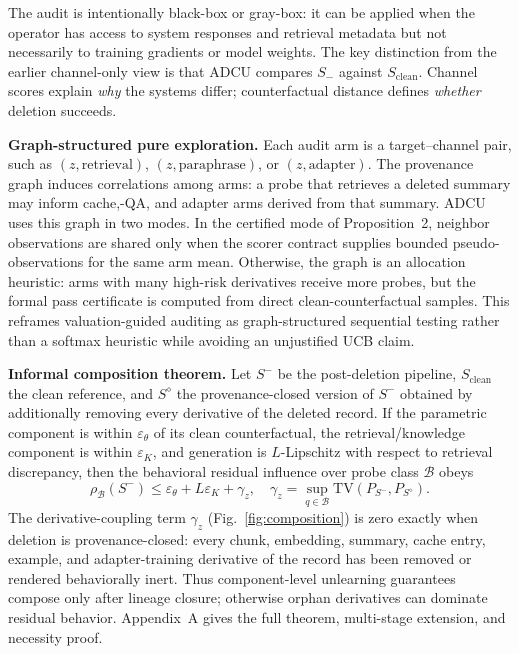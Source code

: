 \documentclass[10pt,journal,compsoc]{IEEEtran}
\newcommand{\method}{ADCU}
\begin{document}
The audit is intentionally black-box or gray-box: it can be applied when the operator has access to system responses and retrieval metadata but not necessarily to training gradients or model weights. The key distinction from the earlier channel-only view is that \method{} compares $S_-$ against $S_{\mathrm{clean}}$. Channel scores explain \emph{why} the systems differ; counterfactual distance defines \emph{whether} deletion succeeds.

\textbf{Graph-structured pure exploration.}
Each audit arm is a target--channel pair, such as $(z,\mathrm{retrieval})$, $(z,\mathrm{paraphrase})$, or $(z,\mathrm{adapter})$. The provenance graph induces correlations among arms: a probe that retrieves a deleted summary may inform cache,-QA, and adapter arms derived from that summary. \method{} uses this graph in two modes. In the certified mode of Proposition~2, neighbor observations are shared only when the scorer contract supplies bounded pseudo-observations for the same arm mean. Otherwise, the graph is an allocation heuristic: arms with many high-risk derivatives receive more probes, but the formal pass certificate is computed from direct clean-counterfactual samples. This reframes valuation-guided auditing as graph-structured sequential testing rather than a softmax heuristic while avoiding an unjustified UCB claim.

\textbf{Informal composition theorem.}
Let $S^-$ be the post-deletion pipeline, $S_{\mathrm{clean}}$ the clean reference, and $S^\diamond$ the provenance-closed version of $S^-$ obtained by additionally removing every derivative of the deleted record. If the parametric component is within $\varepsilon_\theta$ of its clean counterfactual, the retrieval/knowledge component is within $\varepsilon_K$, and generation is $L$-Lipschitz with respect to retrieval discrepancy, then the behavioral residual influence over probe class $\mathcal{B}$ obeys
\[
\rho_{\mathcal{B}}(S^-)
\le
\varepsilon_\theta + L\varepsilon_K + \gamma_z,
\quad
\gamma_z=\sup_{q\in\mathcal{B}}\mathrm{TV}(P_{S^-},P_{S^\diamond}).
\]
The derivative-coupling term $\gamma_z$ (Fig.~\ref{fig:composition}) is zero exactly when deletion is provenance-closed: every chunk, embedding, summary, cache entry, example, and adapter-training derivative of the record has been removed or rendered behaviorally inert. Thus component-level unlearning guarantees compose only after lineage closure; otherwise orphan derivatives can dominate residual behavior. Appendix~A gives the full theorem, multi-stage extension, and necessity proof.
\end{document}
